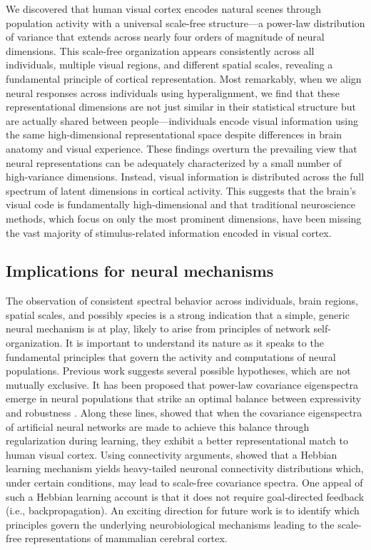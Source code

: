 \documentclass[10pt]{article}
\begin{document}
We discovered that human visual cortex encodes natural scenes through population activity with a universal scale-free structure---a power-law distribution of variance that extends across nearly four orders of magnitude of neural dimensions. This scale-free organization appears consistently across all individuals, multiple visual regions, and different spatial scales, revealing a fundamental principle of cortical representation. Most remarkably, when we align neural responses across individuals using hyperalignment, we find that these representational dimensions are not just similar in their statistical structure but are actually shared between people---individuals encode visual information using the same high-dimensional representational space despite differences in brain anatomy and visual experience. These findings overturn the prevailing view that neural representations can be adequately characterized by a small number of high-variance dimensions. Instead, visual information is distributed across the full spectrum of latent dimensions in cortical activity. This suggests that the brain's visual code is fundamentally high-dimensional and that traditional neuroscience methods, which focus on only the most prominent dimensions, have been missing the vast majority of stimulus-related information encoded in visual cortex.

\subsection{Implications for neural mechanisms}\label{implications-for-neural-mechanisms}

The observation of consistent spectral behavior across individuals, brain regions, spatial scales, and possibly species is a strong indication that a simple, generic neural mechanism is at play, likely to arise from principles of network self-organization. It is important to understand its nature as it speaks to the fundamental principles that govern the activity and computations of neural populations. Previous work suggests several possible hypotheses, which are not mutually exclusive. It has been proposed that power-law covariance eigenspectra emerge in neural populations that strike an optimal balance between expressivity and robustness \autocite{Stringer2019}. Along these lines, \textcite{Prince2024} showed that when the covariance eigenspectra of artificial neural networks are made to achieve this balance through regularization during learning, they exhibit a better representational match to human visual cortex. Using connectivity arguments, \textcite{Lynn2024} showed that a Hebbian learning mechanism yields heavy-tailed neuronal connectivity distributions which, under certain conditions, may lead to scale-free covariance spectra. One appeal of such a Hebbian learning account is that it does not require goal-directed feedback (i.e., backpropagation). An exciting direction for future work is to identify which principles govern the underlying neurobiological mechanisms leading to the scale-free representations of mammalian cerebral cortex.
\end{document}
